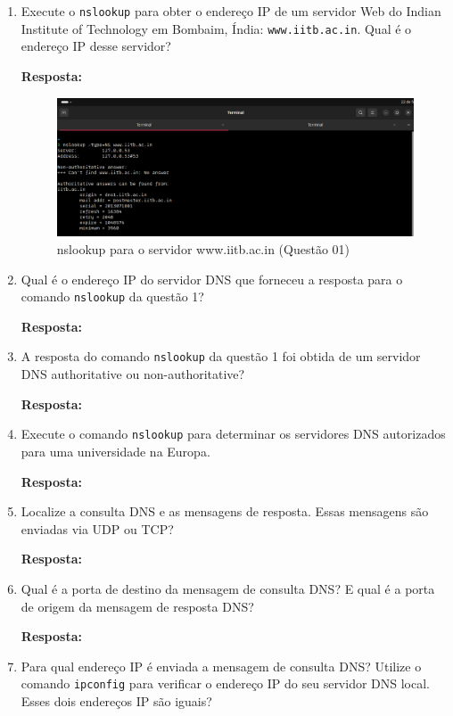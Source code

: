 \documentclass[12pt,a4paper]{report}
\begin{document}
	\begin{enumerate}
		\item Execute o \texttt{nslookup} para obter o endereço IP de um servidor Web do Indian Institute of Technology em Bombaim, Índia: \texttt{www.iitb.ac.in}. Qual é o endereço IP desse servidor?
		
		\textbf{Resposta:} 

		\begin{figure}[H]
			\centering
			\includegraphics[width=1\textwidth]{q1.png}
			\caption{nslookup para o servidor www.iitb.ac.in (Questão 01)}
			\label{fig:versaoHTTP}
		\end{figure}

		\item Qual é o endereço IP do servidor DNS que forneceu a resposta para o comando \texttt{nslookup} da questão 1?
		
		\textbf{Resposta:} 

		\item A resposta do comando \texttt{nslookup} da questão 1 foi obtida de um servidor DNS authoritative ou non-authoritative?
		
		\textbf{Resposta:} 

		\item Execute o comando \texttt{nslookup} para determinar os servidores DNS autorizados para uma universidade na Europa.
		
		\textbf{Resposta:} 

		\item Localize a consulta DNS e as mensagens de resposta. Essas mensagens são enviadas via UDP ou TCP?
		
		\textbf{Resposta:} 

		\item Qual é a porta de destino da mensagem de consulta DNS? E qual é a porta de origem da mensagem de resposta DNS?
		
		\textbf{Resposta:} 

		\item Para qual endereço IP é enviada a mensagem de consulta DNS? Utilize o comando \texttt{ipconfig} para verificar o endereço IP do seu servidor DNS local. Esses dois endereços IP são iguais?
		

\end{enumerate}
\end{document}
